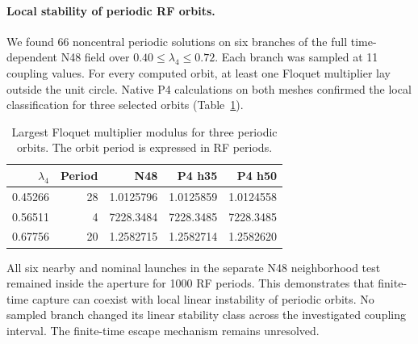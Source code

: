 \paragraph{Local stability of periodic RF orbits.}
We found 66 noncentral periodic solutions on six branches of the full
time-dependent N48 field over \(0.40\leq\lambda_4\leq0.72\). Each branch
was sampled at 11 coupling values. For every computed orbit, at least one
Floquet multiplier lay outside the unit circle. Native P4 calculations
on both meshes confirmed the local classification for three selected orbits
(Table~\ref{tab:floquet-p4}).

\begin{table}[ht]
\centering
\caption{Largest Floquet multiplier modulus for three periodic orbits.
The orbit period is expressed in RF periods.}
\label{tab:floquet-p4}
\begin{tabular}{rrrrr}
\toprule
\(\lambda_4\) & Period & N48 & P4 h35 & P4 h50 \\
\midrule
0.45266 & 28 & 1.0125796 & 1.0125859 & 1.0124558 \\
0.56511 & 4  & 7228.3484 & 7228.3485 & 7228.3485 \\
0.67756 & 20 & 1.2582715 & 1.2582714 & 1.2582620 \\
\bottomrule
\end{tabular}
\end{table}

All six nearby and nominal launches in the separate N48 neighborhood
test remained inside the aperture for 1000 RF periods. This demonstrates
that finite-time capture can coexist with local linear instability of
periodic orbits. No sampled branch changed its linear stability class
across the investigated coupling interval. The finite-time escape
mechanism remains unresolved.
